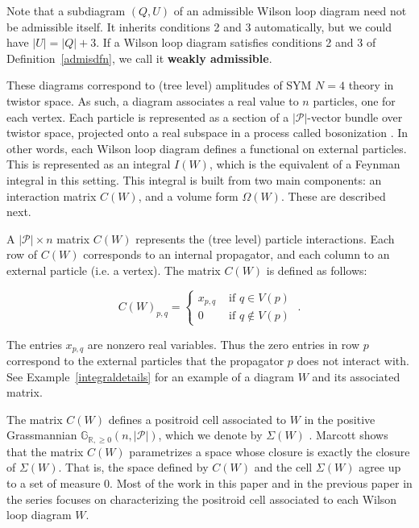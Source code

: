 \documentclass[11pt]{article}
\newcommand{\R}{\mathbb{R}}
\newcommand{\Gr}{\mathbb{G}_{\R, \geq 0}}
\newcommand{\cP}{\mathcal{P}}
\theoremstyle{remark}
\theoremstyle{definition}
\begin{document}
Note that a subdiagram $(Q,U)$ of an admissible Wilson loop diagram need not be admissible itself.  It inherits conditions 2 and 3 automatically, but we could have $|U| = |Q| + 3$. If a Wilson loop diagram satisfies conditions 2 and 3 of Definition~\ref{admisdfn}, we call it {\bf weakly admissible}.

These diagrams correspond to (tree level) amplitudes of SYM $N=4$ theory in twistor space. As such, a diagram associates a real value to $n$ particles, one for each vertex. Each particle is represented as a section of a $|\cP|$-vector bundle over twistor space, projected onto a real subspace in a process called bosonization \cite[section 2]{Amplituhedronsquared}. In other words, each Wilson loop diagram defines a functional on external particles. This is represented as an integral $I(W)$, which is the equivalent of a Feynman integral in this setting. This integral is built from two main components: an interaction matrix $C(W)$, and a volume form $\Omega(W)$. These are described next.

A $|\cP| \times n$ matrix $C(W)$ represents the (tree level) particle interactions. Each row of $C(W)$ corresponds to an internal propagator, and each column to an external particle (i.e. a vertex). The matrix $C(W)$ is defined as follows:

\begin{equation} C(W)_{p,q} = \begin{cases} x_{p,q} & \textrm{ if } q \in V(p) \\
0  & \textrm{ if } q \not \in V(p)  \end{cases}
\;. \label{C(W) dfn}\end{equation} 

The entries $x_{p,q}$ are nonzero real variables. Thus the zero entries in row $p$ correspond to the external particles that the propagator $p$ does not interact with. See Example~\ref{integraldetails} for an example of a diagram $W$ and its associated matrix.

The matrix $C(W)$ defines a positroid cell associated to $W$ in the positive Grassmannian $\Gr(n, |\cP|)$, which we denote by $\Sigma(W)$ \cite[Theorem 3.41]{wilsonloop}. Marcott \cite[Theorem 8.4]{WLDdim} shows that  the matrix $C(W)$ parametrizes a space whose closure is exactly the closure of $\Sigma(W)$. That is, the space defined by $C(W)$ and the cell $\Sigma(W)$ agree up to a set of measure $0$. Most of the work in this paper and in the previous paper in the series \cite{generalcombinatoricsI} focuses on characterizing the positroid cell associated to each Wilson loop diagram $W$. 
\end{document}
